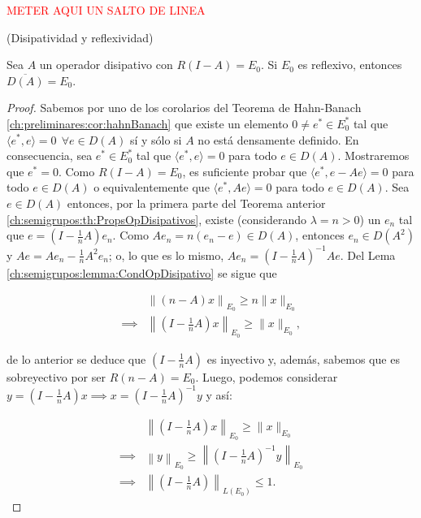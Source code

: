 \textcolor{red}{METER AQUI UN SALTO DE LINEA}\\

\begin{Teorema}{(Disipatividad y reflexividad)}
    \label{ch:semigrupos:th:DisipYReflex}

    Sea $A$ un operador disipativo con $R(I - A) = E_0$. Si $E_0$ es reflexivo\footnotemark, entonces $\overline{D(A)} = E_0$.
\end{Teorema}
\footnotetext{\textcolor{red}{PONER DEF DE ESPACIO REFLEX}}
\begin{proof}
    Sabemos por uno de los corolarios del Teorema de Hahn-Banach \ref{ch:preliminares:cor:hahnBanach} que existe un elemento $0 \neq e^* \in E^*_0$ tal que $\langle e^*, e\rangle = 0 \ \ \forall e \in D(A)$ sí y sólo si $A$ no está densamente definido. En consecuencia, sea $e^* \in E_0^*$ tal que $\langle e^*, e \rangle = 0$ para todo $e \in D(A)$. Mostraremos que $e^* = 0$. Como $R(I- A) = E_0$, es suficiente probar que $\langle e^*, e - Ae \rangle = 0$ para todo $e \in D(A)$ o equivalentemente que $\langle e^*, Ae \rangle = 0$ para todo $e \in D(A)$. Sea $e \in D(A)$ entonces, por la primera parte del Teorema anterior \ref{ch:semigrupos:th:PropsOpDisipativos}, existe (considerando $\lambda = n > 0$) un $e_n$ tal que $e = (I - \frac{1}{n}A)e_n$. Como $Ae_n = n(e_n - e) \in D(A)$, entonces $e_n \in D(A^2)$ y $Ae = Ae_n - \frac{1}{n}A^2e_n$; o, lo que es lo mismo, $Ae_n = (I - \frac{1}{n}A)^{-1}Ae$. Del Lema \ref{ch:semigrupos:lemma:CondOpDisipativo} se sigue que 

    \begin{align*}
        &\left \lVert \left (n - A \right ) x\right \rVert_{E_0} \geq n \lVert x \rVert_{E_0}\\
        \implies& \left \lVert \left (I - \frac{1}{n}A \right ) x\right \rVert_{E_0} \geq \lVert x \rVert_{E_0},
    \end{align*}

    de lo anterior se deduce que $(I - \frac{1}{n}A)$ es inyectivo y, además, sabemos que es sobreyectivo por ser $R(n - A) = E_0$. Luego, podemos considerar $y = (I - \frac{1}{n}A)x \implies x = (I-\frac{1}{n}A)^{-1}y$ y así:

    \begin{align*}
        &\left \lVert \left (I - \frac{1}{n}A \right ) x\right \rVert_{E_0} \geq \lVert x \rVert_{E_0}\\
        \implies& \left \lVert y \right \rVert_{E_0} \geq \left \lVert \left (I - \frac{1}{n}A \right )^{-1} y\right \rVert_{E_0}\\
        \implies& \left \lVert \left (I - \frac{1}{n}A \right )\right \rVert_{L(E_0)} \leq 1.
    \end{align*}    


\end{proof}
